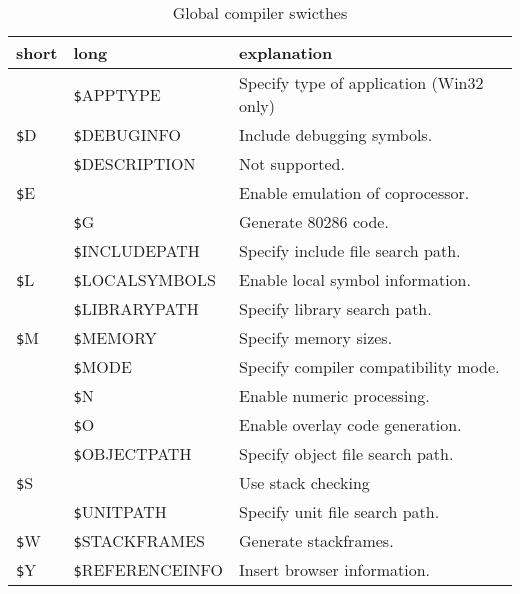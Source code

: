\documentclass{article}
\newcommand{\var}[1]{{\texttt #1}}
\begin{document}
\begin{table}
\caption{Global compiler swicthes}
\begin{tabularx}{\textwidth}{llX}
\textbf {short} & \textbf {long} & \textbf{explanation }\\ \hline
 & \var{\$APPTYPE} & Specify type of application (Win32 only) \\
\var{\$D} & \var{\$DEBUGINFO} & Include debugging symbols. \\
 & \var{\$DESCRIPTION} & Not supported. \\
\var{\$E} & & Enable emulation of coprocessor. \\
 & \var{\$G} & Generate 80286 code. \\
 & \var{\$INCLUDEPATH} & Specify include file search path. \\
\var{\$L} & \var{\$LOCALSYMBOLS} & Enable local symbol information. \\
 & \var{\$LIBRARYPATH} & Specify library search path. \\
\var{\$M} & \var{\$MEMORY} & Specify memory sizes. \\
 & \var{\$MODE} & Specify compiler compatibility mode. \\
 & \var{\$N} & Enable numeric processing.  \\
 & \var{\$O} & Enable overlay code generation.  \\
 & \var{\$OBJECTPATH} & Specify object file search path. \\
\var{\$S} & & Use stack checking \\
 & \var{\$UNITPATH} & Specify unit file search path. \\
\var{\$W} & \var{\$STACKFRAMES} & Generate stackframes. \\
\var{\$Y} & \var{\$REFERENCEINFO} & Insert browser information. \\ \hline
\end{tabularx}
\end{table}
\end{document}
